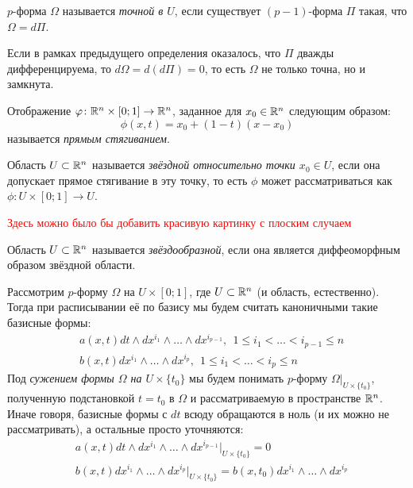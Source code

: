 \begin{definition}
	$p$-форма $\Omega$ называется \textit{точной в $U$}, если существует $(p - 1)$-форма $\Pi$ такая, что $\Omega = d\Pi$.
\end{definition}

\begin{note}
	Если в рамках предыдущего определения оказалось, что $\Pi$ дважды дифференцируема, то $d\Omega = d(d\Pi) = 0$, то есть $\Omega$ не только точна, но и замкнута.
\end{note}

\begin{definition}
	Отображение $\varphi \colon \mathbb{R}^n \times [0; 1] \to \mathbb{R}^n$, заданное для $x_0 \in \mathbb{R}^n$ следующим образом:
	\[
		\phi(x, t) = x_0 + (1 - t)(x - x_0)
	\]
	называется \textit{прямым стягиванием}.
\end{definition}

\begin{definition}
	Область $U \subset \mathbb{R}^n$ называется \textit{звёздной относительно точки $x_0 \in U$}, если она допускает прямое стягивание в эту точку, то есть $\phi$ может рассматриваться как $\phi \colon U \times [0; 1] \to U$.
\end{definition}

\textcolor{red}{Здесь можно было бы добавить красивую картинку с плоским случаем}

\begin{definition}
	Область $U \subset \mathbb{R}^n$ называется \textit{звёздообразной}, если она является диффеоморфным образом звёздной области.
\end{definition}

\begin{note}
	Рассмотрим $p$-форму $\Omega$ на $U \times [0; 1]$, где $U \subset \mathbb{R}^n$ (и область, естественно). Тогда при расписывании её по базису мы будем считать каноничными такие базисные формы:
	\begin{align*}
		&{a(x, t)dt \wedge dx^{i_1} \wedge \ldots \wedge dx^{i_{p - 1}},\ \ 1 \le i_1 < \ldots < i_{p - 1} \le n}
		\\
		&{b(x, t)dx^{i_1} \wedge \ldots \wedge dx^{i_p},\ \ 1 \le i_1 < \ldots < i_p \le n}
	\end{align*}
	Под \textit{сужением формы $\Omega$ на $U \times \{t_0\}$} мы будем понимать $p$-форму $\Omega|_{U \times \{t_0\}}$, полученную подстановкой $t = t_0$ в $\Omega$ и рассматриваемую в пространстве $\mathbb{R}^n$. Иначе говоря, базисные формы с $dt$ всюду обращаются в ноль (и их можно не рассматривать), а остальные просто уточняются:
	\begin{align*}
		&{a(x, t)dt \wedge dx^{i_1} \wedge \ldots \wedge dx^{i_{p - 1}}|_{U \times \{t_0\}} = 0}
		\\
		&{b(x, t)dx^{i_1} \wedge \ldots \wedge dx^{i_p}|_{U \times \{t_0\}} = b(x, t_0)dx^{i_1} \wedge \ldots \wedge dx^{i_p}}
	\end{align*}
\end{note}

